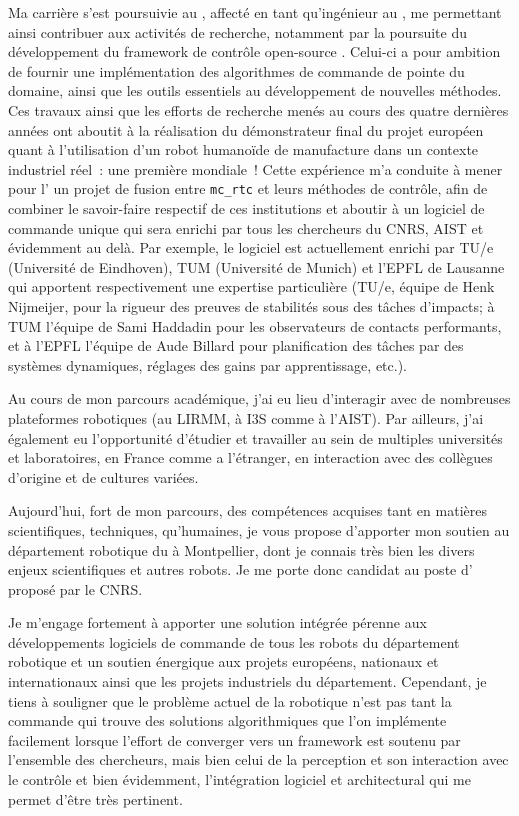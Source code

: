 \documentclass[11pt, a4paper]{awesome-cv}
\begin{document}
\begin{cvletter}
Ma carrière s'est poursuivie au , affecté en tant qu'ingénieur au , me permettant ainsi contribuer aux activités de recherche, notamment par la poursuite du développement du framework de contrôle open-source . Celui-ci a pour ambition de fournir une implémentation des algorithmes de commande de pointe du domaine, ainsi que les outils essentiels au développement de nouvelles méthodes. Ces travaux ainsi que les efforts de recherche menés au cours des quatre dernières années ont aboutit à la réalisation du démonstrateur final du projet européen  quant à l'utilisation d'un robot humanoïde de manufacture dans un contexte industriel réel~: une première mondiale~! Cette expérience m'a conduite à mener pour l' un projet de fusion entre {\tt mc\_rtc} et leurs méthodes de contrôle, afin de combiner le savoir-faire respectif de ces institutions et aboutir à un logiciel de commande unique qui sera enrichi par tous les chercheurs du CNRS, AIST et évidemment au delà. Par exemple, le logiciel est actuellement enrichi par TU/e (Université de Eindhoven), TUM (Université de Munich) et l'EPFL de Lausanne qui apportent respectivement une expertise particulière (TU/e, équipe de Henk Nijmeijer, pour la rigueur des preuves de stabilités sous des tâches d'impacts; à TUM l'équipe de Sami Haddadin pour les observateurs de contacts performants, et à l'EPFL l'équipe de Aude Billard pour planification des tâches par des systèmes dynamiques, réglages des gains par apprentissage, etc.).  

Au cours de mon parcours académique, j'ai eu lieu d'interagir avec de nombreuses plateformes robotiques (au LIRMM, à I3S comme à l'AIST). Par ailleurs, j'ai également eu l'opportunité d'étudier et travailler au sein de multiples universités et laboratoires, en France comme a l'étranger, en interaction avec des collègues d'origine et de cultures variées.

Aujourd'hui, fort de mon parcours, des compétences acquises tant en matières scientifiques, techniques, qu'humaines, je vous propose d'apporter mon soutien au département robotique du  à Montpellier, dont je connais très bien les divers enjeux scientifiques et autres robots. Je me porte donc candidat au poste d' proposé par le CNRS.

Je m'engage fortement à apporter une solution intégrée pérenne aux développements logiciels de commande de tous les robots du département robotique et un soutien énergique aux projets européens, nationaux et internationaux ainsi que les projets industriels du département. Cependant, je tiens à souligner que le problème actuel de la robotique n'est pas tant la commande qui trouve des solutions algorithmiques que l'on implémente facilement lorsque l'effort de converger vers un framework est soutenu par l'ensemble des chercheurs, mais bien celui de la perception et son interaction avec le contrôle et bien évidemment, l'intégration logiciel et architectural qui me permet d'être très pertinent.  

\end{cvletter}


\makeletterclosing
\end{document}
